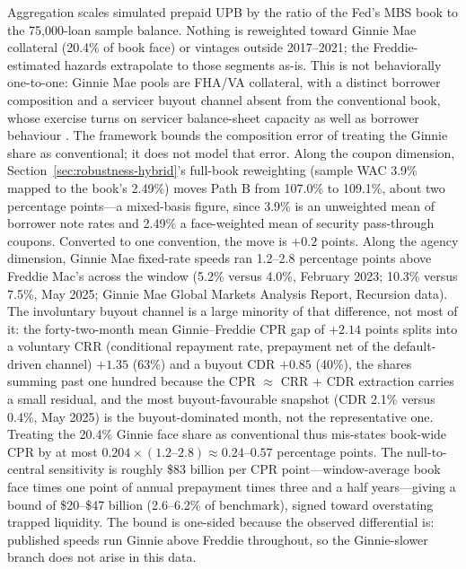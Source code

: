 Aggregation scales simulated prepaid UPB by the ratio of the Fed's MBS book to the 75,000-loan sample balance. Nothing is reweighted toward Ginnie Mae collateral (20.4\% of book face) or vintages outside 2017--2021; the Freddie-estimated hazards extrapolate to those segments as-is. This is not behaviorally one-to-one: Ginnie Mae pools are FHA/VA collateral, with a distinct borrower composition and a servicer buyout channel absent from the conventional book, whose exercise turns on servicer balance-sheet capacity as well as borrower behaviour \citep{aiello2022}. The framework bounds the composition error of treating the Ginnie share as conventional; it does not model that error. Along the coupon dimension, Section~\ref{sec:robustness-hybrid}'s full-book reweighting (sample WAC 3.9\% mapped to the book's 2.49\%) moves Path B from 107.0\% to 109.1\%, about two percentage points---a mixed-basis figure, since 3.9\% is an unweighted mean of borrower note rates and 2.49\% a face-weighted mean of security pass-through coupons. Converted to one convention, the move is $+0.2$ points. Along the agency dimension, Ginnie Mae fixed-rate speeds ran 1.2--2.8 percentage points above Freddie Mac's across the window (5.2\% versus 4.0\%, February 2023; 10.3\% versus 7.5\%, May 2025; Ginnie Mae Global Markets Analysis Report, Recursion data). The involuntary buyout channel is a large minority of that difference, not most of it: the forty-two-month mean Ginnie--Freddie CPR gap of $+2.14$ points splits into a voluntary CRR (conditional repayment rate, prepayment net of the default-driven channel) $+1.35$ (63\%) and a buyout CDR $+0.85$ (40\%), the shares summing past one hundred because the CPR $\approx$ CRR $+$ CDR extraction carries a small residual, and the most buyout-favourable snapshot (CDR 2.1\% versus 0.4\%, May 2025) is the buyout-dominated month, not the representative one. Treating the 20.4\% Ginnie face share as conventional thus mis-states book-wide CPR by at most $0.204 \times (1.2\text{--}2.8) \approx 0.24$--$0.57$ percentage points. The null-to-central sensitivity is roughly \$83 billion per CPR point---window-average book face times one point of annual prepayment times three and a half years---giving a bound of \$20--\$47 billion (2.6--6.2\% of benchmark), signed toward overstating trapped liquidity. The bound is one-sided because the observed differential is: published speeds run Ginnie above Freddie throughout, so the Ginnie-slower branch does not arise in this data.

